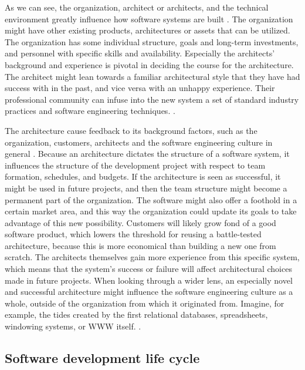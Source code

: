 \documentclass[utf8,english]{gradu3}
\begin{document}
As we can see, the organization, architect or architects, and the technical
environment greatly influence how software systems are built
\parencite{Bass1998}. The organization might have other existing products,
architectures or assets that can be utilized. The organization has some
individual structure, goals and long-term investments, and personnel with
specific skills and availability. Especially the architects' background and
experience is pivotal in deciding the course for the architecture. The architect
might lean towards a familiar architectural style that they have had success with in
the past, and vice versa with an unhappy experience. Their professional
community can infuse into the new system a set of standard industry practices
and software engineering techniques. \parencite[5-9]{Bass1998}.

The architecture cause feedback to its background factors, such as the
organization, customers, architects and the software engineering culture in
general \parencite{Bass1998}. Because an architecture dictates the structure of
a software system, it influences the structure of the development project with
respect to team formation, schedules, and budgets. If the architecture is seen as
successful, it might be used in future projects, and then the team structure
might become a permanent part of the organization. The software might also offer
a foothold in a certain market area, and this way the organization could update
its goals to take advantage of this new possibility. Customers will likely grow
fond of a good software product, which lowers the threshold for reusing a
battle-tested architecture, because this is more economical than building a new
one from scratch. The architects themselves gain more experience from this
specific system, which means that the system's success or failure will affect
architectural choices made in future projects. When looking through a wider
lens, an especially novel and successful architecture might influence the
software engineering culture as a whole, outside of the organization from which
it originated from. Imagine, for example, the tides created by the first relational
databases, spreadsheets, windowing systems, or WWW itself.
\parencite[10-11]{Bass1998}.


\subsection{Software development life cycle}
\end{document}
